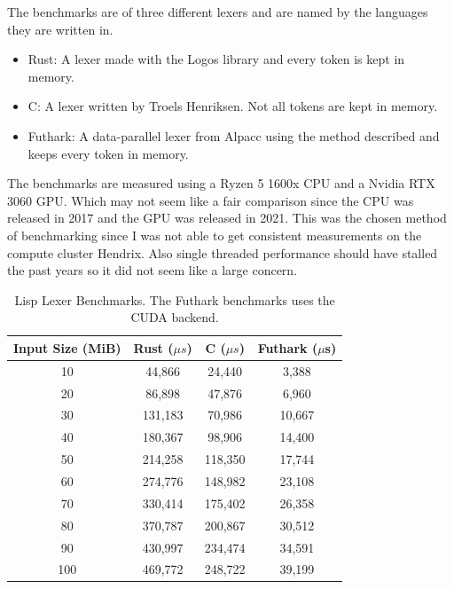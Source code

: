 \documentclass[a4paper,12pt]{article}
\theoremstyle{definition}
\begin{document}
The benchmarks are of three different lexers and are named by the languages they are written in.
\begin{itemize}
  \item Rust: A lexer made with the Logos library and every token is kept in memory.
  \item C: A lexer written by Troels Henriksen. Not all tokens are kept in memory.
  \item Futhark: A data-parallel lexer from Alpacc \cite{due2023} using the method described and keeps every token in memory.
\end{itemize}
The benchmarks are measured using a Ryzen 5 1600x CPU and a Nvidia RTX 3060 GPU. Which may not seem like a fair comparison since the CPU was released in 2017 and the GPU was released in 2021. This was the chosen method of benchmarking since I was not able to get consistent measurements on the compute cluster Hendrix. Also single threaded performance should have stalled the past years so it did not seem like a large concern.

\begin{table}[H]
  \centering
  \begin{tabular}{c|c|c|c}
    Input Size (MiB) & Rust ($\mu s$) & C ($\mu s$) & Futhark ($\mu$s) \\ \hline
    10 & 44,866 & 24,440 & 3,388 \\
    20 & 86,898 & 47,876 & 6,960 \\
    30 & 131,183 & 70,986 & 10,667 \\
    40 & 180,367 & 98,906 & 14,400 \\
    50 & 214,258 & 118,350 & 17,744 \\
    60 & 274,776 & 148,982 & 23,108 \\
    70 & 330,414 & 175,402 & 26,358 \\
    80 & 370,787 & 200,867 & 30,512 \\
    90 & 430,997 & 234,474 & 34,591 \\
    100 & 469,772 & 248,722 & 39,199
  \end{tabular}
  \caption{Lisp Lexer Benchmarks. The Futhark benchmarks uses the CUDA backend.}
\end{table}
\end{document}
